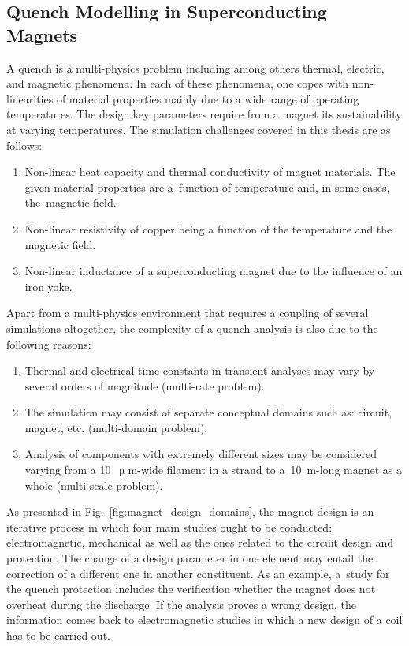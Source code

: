 
\subsection{Quench Modelling in Superconducting Magnets}

A quench is a multi-physics problem including among others thermal, electric, and magnetic phenomena. In each of these phenomena, one copes with non-linearities of material properties mainly due to a wide range of operating temperatures. The design key parameters require from a magnet its sustainability at varying temperatures. The simulation challenges covered in this thesis are as follows: 

\begin{enumerate}
    \item Non-linear heat capacity and thermal conductivity of magnet materials. The given material properties are a~function of temperature and, in some cases, the~magnetic field. 
    \item Non-linear resistivity of copper being a function of the temperature and the magnetic field.
    \item Non-linear inductance of a superconducting magnet due to the influence of an iron yoke. 
\end{enumerate}

Apart from a multi-physics environment that requires a coupling of several simulations altogether, the complexity of a quench analysis is also due to the following reasons: 
\begin{enumerate}
    \item Thermal and electrical time constants in transient analyses may vary by several orders of magnitude (multi-rate problem).
    \item The simulation may consist of separate conceptual domains such as: circuit, magnet, etc. (multi-domain problem).
    \item Analysis of components with extremely different sizes may be considered varying from a 10~$\upmu$m-wide filament in a strand to a~10~m-long magnet as a whole (multi-scale problem).
\end{enumerate}

As presented in Fig.~\ref{fig:magnet_design_domains}, the magnet design is an iterative process in which four main studies ought to be conducted: electromagnetic, mechanical as well as the ones related to the circuit design and protection. The change of a design parameter in one element may entail the correction of a different one in another constituent. As an example, a~study for the quench protection includes the verification whether the magnet does not overheat during the discharge. If the analysis proves a wrong design, the information comes back to electromagnetic studies in which a new design of a coil has to be carried out.~\cite{quench_protection_system_applied_prioli}

